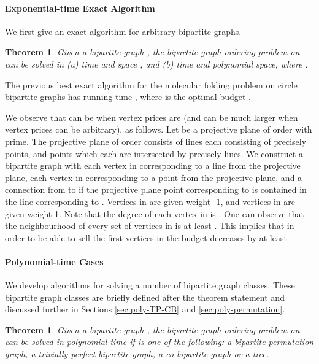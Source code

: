 \documentclass[letterpaper,11pt,abstracton]{scrartcl}
\newtheorem{tm}[theorem]{Theorem}
\begin{document}
\paragraph{Exponential-time Exact Algorithm}
We first give an exact algorithm for arbitrary bipartite graphs.
\begin{tm}\label{thm:exp}
  Given a bipartite graph , the bipartite graph ordering problem on  can be
  solved in (a) time and space , and (b) time  and polynomial
  space, where .
\end{tm}
The previous best exact algorithm for the molecular folding
problem on circle bipartite graphs has running time , where  is the optimal budget
\cite{TMRM09}.

We observe that  can be  when vertex prices
are  (and can be much larger when vertex prices can be arbitrary), as follows.
Let  be a projective plane of order  with  prime.  The projective plane of order  consists of  lines each consisting of
precisely  points, and  points which each are intersected by precisely 
lines.  We construct a bipartite graph with each vertex in  corresponding
to a line from the projective plane, each vertex in  corresponding
to a point from the projective plane, and a connection from  to
 if the projective plane point corresponding to  is contained in
the line corresponding to .  Vertices in  are given weight -1, and
vertices in  are given weight 1.
Note that the degree of each vertex in  is . One can observe that the neighbourhood of every set of  vertices in  is at
least . This implies
that in order to be able to sell the first  vertices in  the budget decreases by at least .


\paragraph{Polynomial-time Cases}


We develop algorithms for solving  a number of bipartite graph classes.
These bipartite graph classes are briefly defined after the theorem statement and
discussed further in Sections \ref{sec:poly-TP-CB} and \ref{sec:poly-permutation}.

\begin{tm}\label{thm:main}
  Given a bipartite graph , the bipartite graph ordering problem on  can be
  solved in polynomial time if  is one of the following:
  a bipartite permutation graph, a trivially perfect bipartite graph, a co-bipartite graph or a tree.
\end{tm}
\end{document}
